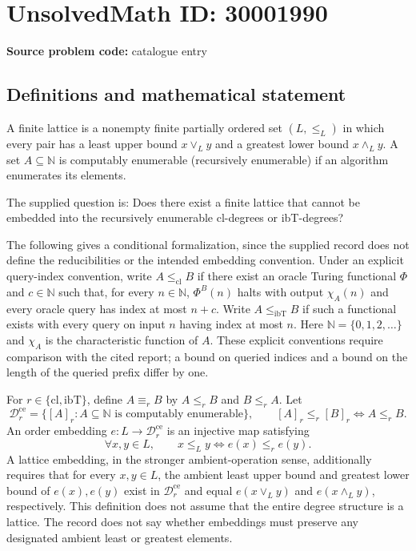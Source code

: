 \documentclass[11pt]{article}
\newcommand{\N}{\mathbb{N}}
\begin{document}
\section*{UnsolvedMath ID: 30001990}
\textbf{Source problem code:} catalogue entry
\subsection{Definitions and mathematical statement}
A finite lattice is a nonempty finite partially ordered set \((L,\leq_L)\) in which every pair has a least upper bound \(x\vee_L y\) and a greatest lower bound \(x\wedge_L y\). A set \(A\subseteq\N\) is computably enumerable (recursively enumerable) if an algorithm enumerates its elements.

The supplied question is: Does there exist a finite lattice that cannot be embedded into the recursively enumerable cl-degrees or ibT-degrees?

The following gives a conditional formalization, since the supplied record does not define the reducibilities or the intended embedding convention. Under an explicit query-index convention, write \(A\leq_{\mathrm{cl}}B\) if there exist an oracle Turing functional \(\Phi\) and \(c\in\N\) such that, for every \(n\in\N\), \(\Phi^B(n)\) halts with output \(\chi_A(n)\) and every oracle query has index at most \(n+c\). Write \(A\leq_{\mathrm{ibT}}B\) if such a functional exists with every query on input \(n\) having index at most \(n\). Here \(\N=\{0,1,2,\ldots\}\) and \(\chi_A\) is the characteristic function of \(A\). These explicit conventions require comparison with the cited report; a bound on queried indices and a bound on the length of the queried prefix differ by one.

For \(r\in\{\mathrm{cl},\mathrm{ibT}\}\), define \(A\equiv_r B\) by \(A\leq_r B\) and \(B\leq_r A\). Let
\[
\mathcal D_r^{\mathrm{ce}}=\{[A]_r:A\subseteq\N\text{ is computably enumerable}\},
\qquad [A]_r\leq_r[B]_r\iff A\leq_r B.
\]
An order embedding \(e:L\to\mathcal D_r^{\mathrm{ce}}\) is an injective map satisfying
\[
\forall x,y\in L,\qquad x\leq_L y\iff e(x)\leq_r e(y).
\]
A lattice embedding, in the stronger ambient-operation sense, additionally requires that for every \(x,y\in L\), the ambient least upper bound and greatest lower bound of \(e(x),e(y)\) exist in \(\mathcal D_r^{\mathrm{ce}}\) and equal \(e(x\vee_L y)\) and \(e(x\wedge_L y)\), respectively. This definition does not assume that the entire degree structure is a lattice. The record does not say whether embeddings must preserve any designated ambient least or greatest elements.
\end{document}
